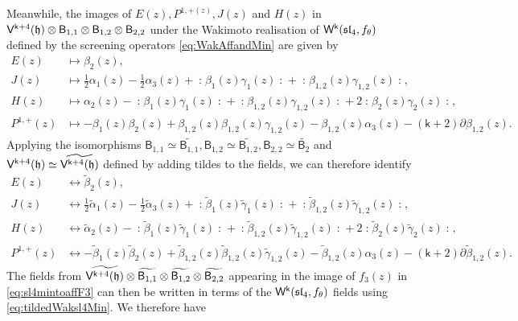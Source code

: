 \documentclass[10pt,a4paper]{amsart}
\numberwithin{equation}{section}
\renewcommand{\cong}{\simeq} %
\newcommand{\kk}{\mathsf{k}}   %
\DeclarePairedDelimiter{\brac}{\lparen}{\rparen}   %
\newcommand{\no}[1]{\mathopen{:} #1 \mathclose{:}} %
\newcommand{\alg}[1]{\mathfrak{#1}}  %
\newcommand{\VOA}[1]{\mathsf{#1}}    %
\newcommand{\SLA}[2]{\alg{#1}_{#2}}                      %
\newcommand{\slfour}{\SLA{sl}{4}}
\newcommand{\fmin}{f_\theta}                                        %
\newcommand{\Wsymb}{\VOA{W}}
\newcommand{\uaffvoa}[2]{\VOA{V}^{#1}\brac{#2}}                   %
\newcommand{\bgvoa}{\VOA{B}}                                      %
\newcommand{\uQHR}[3]{\Wsymb^{#1}\brac{#2,#3}}                    %
\theoremstyle{plain}
\begin{document}
Meanwhile, the images of $E(z), P^{1,+(z)}, J(z)$ and $H(z)$ in $\uaffvoa{\kk+4}{\mathfrak{h}} \otimes \bgvoa_{1,1} \otimes \bgvoa_{1,2} \otimes \bgvoa_{2,2}$ under the Wakimoto realisation of $\uQHR{\kk}{\slfour}{\fmin}$ defined by the screening operators \eqref{eq:WakAffandMin} are given by
%
\begin{equation}
\begin{aligned}
    E(z) &\mapsto \beta_2(z), \\
    J(z) &\mapsto \frac{1}{2}\alpha_1(z) - \frac{1}{2}\alpha_3(z) + \no{\beta_1(z)\gamma_1(z)} + \no{\beta_{1,2}(z)\gamma_{1,2}(z)}, \\
    H(z) &\mapsto \alpha_2(z) - \no{\beta_1(z)\gamma_1(z)} + \no{\beta_{1,2}(z)\gamma_{1,2}(z)} + 2 \no{\beta_2(z)\gamma_2(z)}, \\
    P^{1,+}(z) &\mapsto -\beta_1(z) \beta_2(z) + \beta_{1,2}(z) \beta_{1,2}(z) \gamma_{1,2}(z) - \beta_{1,2}(z) \alpha_3(z) - (\kk+2)\partial \beta_{1,2}(z).
\end{aligned}
\end{equation}
%
Applying the isomorphisms $\bgvoa_{1,1} \cong \widetilde{\bgvoa_{1,1}}, \bgvoa_{1,2} \cong \widetilde{\bgvoa_{1,2}}, \bgvoa_{2,2} \cong \widetilde{\bgvoa_{2}}$ and $\uaffvoa{\kk+4}{\mathfrak{h}} \cong \widetilde{\uaffvoa{\kk+4}{\mathfrak{h}}}$ defined by adding tildes to the fields, we can therefore identify
%
\begin{equation} \label{eq:tildedWaksl4Min}
\begin{aligned}
    E(z) &\leftrightarrow \tilde{\beta}_2(z), \\
    J(z) &\leftrightarrow \frac{1}{2}\tilde{\alpha}_1(z) - \frac{1}{2}\tilde{\alpha}_3(z) + \no{\tilde{\beta}_1(z)\tilde{\gamma}_1(z)} + \no{\tilde{\beta}_{1,2}(z)\tilde{\gamma}_{1,2}(z)}, \\
    H(z) &\leftrightarrow \tilde{\alpha}_2(z) - \no{\tilde{\beta}_1(z)\tilde{\gamma}_1(z)} + \no{\tilde{\beta}_{1,2}(z)\tilde{\gamma}_{1,2}(z)} + 2 \no{\tilde{\beta}_2(z)\tilde{\gamma}_2(z)}, \\
    P^{1,+}(z) &\leftrightarrow -\tilde{\beta}_1(z) \tilde{\beta}_2(z) + \tilde{\beta}_{1,2}(z) \tilde{\beta}_{1,2}(z) \tilde{\gamma}_{1,2}(z) - \tilde{\beta}_{1,2}(z) \alpha_3(z) - (\kk+2)\partial \tilde{\beta}_{1,2}(z).
\end{aligned}
\end{equation}
%
The fields from $\widetilde{\uaffvoa{\kk+4}{\mathfrak{h}}} \otimes \widetilde{\bgvoa_{1,1}} \otimes \widetilde{\bgvoa_{1,2}} \otimes \widetilde{\bgvoa_{2,2}}$ appearing in the image of $f_3(z)$ in \eqref{eq:sl4mintoaffF3} can then be written in terms of the $\uQHR{\kk}{\slfour}{\fmin}$ fields using \eqref{eq:tildedWaksl4Min}. We therefore have
\end{document}
